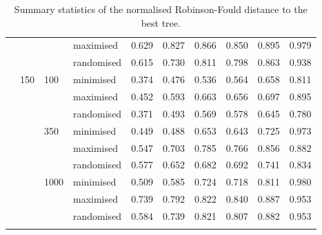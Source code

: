 \begin{longtable}{llllrrrrrr}
   &  &  & maximised & 0.629 & 0.827 & 0.866 & 0.850 & 0.895 & 0.979 \\ 
   &  &  & randomised & 0.615 & 0.730 & 0.811 & 0.798 & 0.863 & 0.938 \\ 
   & 150 & 100 & minimised & 0.374 & 0.476 & 0.536 & 0.564 & 0.658 & 0.811 \\ 
   &  &  & maximised & 0.452 & 0.593 & 0.663 & 0.656 & 0.697 & 0.895 \\ 
   &  &  & randomised & 0.371 & 0.493 & 0.569 & 0.578 & 0.645 & 0.780 \\ 
   &  & 350 & minimised & 0.449 & 0.488 & 0.653 & 0.643 & 0.725 & 0.973 \\ 
   &  &  & maximised & 0.547 & 0.703 & 0.785 & 0.766 & 0.856 & 0.882 \\ 
   &  &  & randomised & 0.577 & 0.652 & 0.682 & 0.692 & 0.741 & 0.834 \\ 
   &  & 1000 & minimised & 0.509 & 0.585 & 0.724 & 0.718 & 0.811 & 0.980 \\ 
   &  &  & maximised & 0.739 & 0.792 & 0.822 & 0.840 & 0.887 & 0.953 \\ 
   &  &  & randomised & 0.584 & 0.739 & 0.821 & 0.807 & 0.882 & 0.953 \\ 
   \hline
\hline
\caption{Summary statistics of the normalised Robinson-Fould distance to the best tree.} 
\label{Full_Tab_SummaryRFbest}
\end{longtable}
